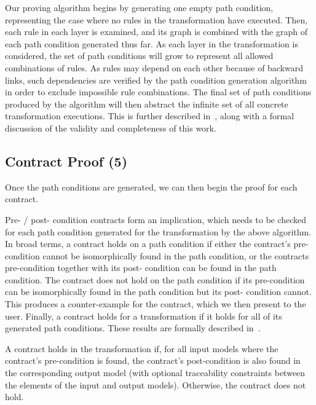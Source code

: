 Our proving algorithm begins by generating one empty
path condition, representing the case where no rules in the
transformation have executed. Then, each rule in each layer
is examined, and its graph is combined with the graph of
each path condition generated thus far. As each layer in the
transformation is considered, the set of path conditions will
grow to represent all allowed combinations of rules. As rules
may depend on each other because of backward links, such
dependencies are verified by the path condition generation
algorithm in order to exclude impossible rule combinations.
The final set of path conditions produced by the algorithm
will then abstract the infinite set of all concrete transformation
executions. This is further described in~\cite{Lucio2014}, along with a
formal discussion of the validity and completeness of this
work.

\subsection{Contract Proof (5)}

Once the path conditions are generated, we can then begin the proof for each contract.

Pre- / post- condition contracts form an implication, which
needs to be checked for each path condition generated for
the transformation by the above algorithm. In broad terms,
a contract holds on a path condition if either the contract’s
pre-condition cannot be isomorphically found in the path
condition, or the contracts pre-condition together with its post-
condition can be found in the path condition. The contract
does not hold on the path condition if its pre-condition can
be isomorphically found in the path condition but its post-
condition cannot. This produces a counter-example for the contract, which we then present to the user. Finally, a contract holds for a transformation if it holds for all of its generated path conditions. These results
are formally described in~\cite{Lucio2014}.

A contract holds in the transformation if, for all input models where the contract's pre-condition is found, the contract's post-condition is also found in the corresponding output model (with optional traceability constraints between the elements of the input and output models). Otherwise, the contract does not hold.


